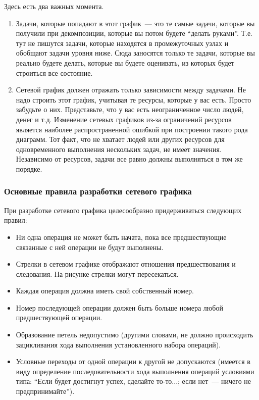 \documentclass{../../text-style}
\begin{document}
Здесь есть два важных момента.

\begin{enumerate}
    \item Задачи, которые попадают в этот график~--- это те самые задачи, которые вы получили при декомпозиции, которые вы потом будете \enquote{делать руками}. Т.е. тут не пишутся задачи, которые находятся в промежуточных узлах и обобщают задачи уровня ниже. Сюда заносятся только те задачи, которые вы реально будете делать, которые вы будете оценивать, из которых будет строиться все состояние.
    \item Сетевой график должен отражать только зависимости между задачами. Не надо строить этот график, учитывая те ресурсы, которые у вас есть. Просто забудьте о них. Представьте, что у вас есть неограниченное число людей, денег и т.д. Изменение сетевых графиков из-за ограничений ресурсов является наиболее распространенной ошибкой при построении такого рода диаграмм. Тот факт, что не хватает людей или других ресурсов для одновременного выполнения нескольких задач, не имеет значения. Независимо от ресурсов, задачи все равно должны выполняться в том же порядке.
\end{enumerate}

\subsubsection{Основные правила разработки сетевого графика}

При разработке сетевого графика целесообразно придерживаться следующих правил:

\begin{itemize}
    \item Ни одна операция не может быть начата, пока все предшествующие связанные с ней операции не будут выполнены.
    \item Стрелки в сетевом графике отображают отношения предшествования и следования. На рисунке стрелки могут пересекаться.
    \item Каждая операция должна иметь свой собственный номер.
    \item Номер последующей операции должен быть больше номера любой предшествующей операции.
    \item Образование петель недопустимо (другими словами, не должно происходить зацикливания хода выполнения установленного набора операций).
    \item Условные переходы от одной операции к другой не допускаются (имеется в виду определение последовательности хода выполнения операций условиями типа: \enquote{Если будет достигнут успех, сделайте то-то...; если нет~--- ничего не предпринимайте}).
\end{itemize}
\end{document}
